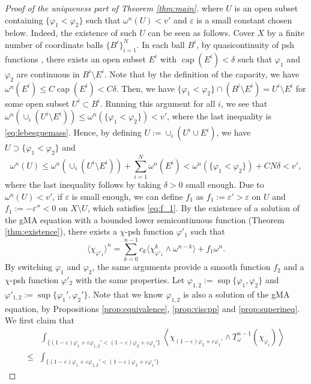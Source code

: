 \documentclass[10pt,a4paper]{amsart}
\numberwithin{equation}{section}
\begin{document}
\begin{proof}[Proof of the uniqueness part of Theorem \ref{thm:main}]
    where $U$ is an open subset containing $\{\varphi_1<\varphi_2\}$ such that $\omega^n(U)<v'$ and $\varepsilon$ is a small constant chosen below. Indeed, the existence of such $U$ can be seen as follows. Cover $X$ by a finite number of coordinate balls $\{B^i\}^N_{i=1}$. In each ball $B^i$, by quasicontinuity of psh functions \cite[Theorem 3.5]{BT}, there exists an open subset $E^i$ with $\operatorname{cap}(E^i)<\delta$ such that $\varphi_1$ and $\varphi_2$ are continuous in $B^i\setminus E^i$. Note that by the definition of the capacity, we have $\omega^n(E^i)\le C \operatorname{cap}(E^i)<C\delta$. Then, we have $\{\varphi_1<\varphi_2\}\cap (B^i\setminus E^i)= U^i\setminus E^i$ for some open subset $U^i\subset B^i$. Running this argument for all $i$, we see that $\omega^n(\cup_i (U^i\setminus E^i))\le\omega^n(\{\varphi_1<\varphi_2\})<v'$, where the last inequality is \eqref{eq:lebesguemass}. Hence, by defining $U:=\cup_i (U^i\cup E^i)$, we have $U\supset\{\varphi_1<\varphi_2\}$ and 
    $$\omega^n(U)\le\omega^n(\cup_i (U^i\setminus E^i))+\sum_{i=1}^N\omega^n(E^i)<\omega^n(\{\varphi_1<\varphi_2\})+CN\delta<v',$$
    where the last inequality follows by taking $\delta>0$ small enough. Due to $\omega^n(U)<v'$, if $\varepsilon$ is small enough, we can define $f_1$ as $f_1:=\varepsilon'>\varepsilon$ on $U$ and $f_1:=-\varepsilon''<0$ on $X\setminus U$, which satisfies \eqref{eq:f_1}.
    By the existence of a solution of the gMA equation with a bounded lower semicontinuous function (Theorem \ref{thm:existence}), there exists a $\chi$-psh function $\varphi'_1$ such that
    $$\langle\chi_{\varphi'_1}\rangle^n=\sum_{k=0}^{n-1}c_k\langle\chi_{\varphi'_1}^k\wedge\omega^{n-k}\rangle+f_1\omega^n.$$
    By switching $\varphi_1$ and $\varphi_2$, the same arguments provide a smooth function $f_2$ and a $\chi$-psh function $\varphi'_2$ with the same properties. Let $\varphi_{1,2}:=\sup\{\varphi_1,\varphi_2\}$ and $\varphi'_{1,2}:=\sup\{\varphi_1',\varphi_2'\}$. Note that we know $\varphi_{1,2}$ is also a solution of the gMA equation, by Propositions \ref{prop:equivalence}, \ref{prop:viscpp} and \ref{prop:superineq}.
    We first claim that
    \begin{equation}\label{ineqJcomp}
    \begin{split}
        &\int_{\{(1-\varepsilon)\varphi_1+\varepsilon\varphi_{1,2}'<(1-\varepsilon)\varphi_2+\varepsilon\varphi_1'\}}
        \left\langle\chi_{(1-\varepsilon)\varphi_2+\varepsilon\varphi_1'}\wedge T^{n-1}_\omega(\chi_{\varphi_i})\right\rangle\\
        \le &\int_{\{(1-\varepsilon)\varphi_1+\varepsilon\varphi_{1,2}'<(1-\varepsilon)\varphi_2+\varepsilon\varphi_1'\}}

\end{split}
\end{equation}
\end{proof}
\end{document}
